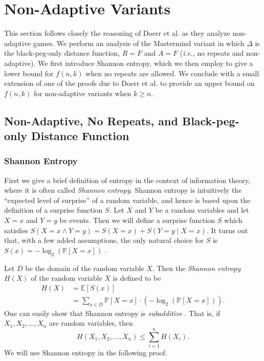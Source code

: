\documentclass[12pt, a4paper]{article}
\begin{document}
\section{Non-Adaptive Variants}
This section follows closely the reasoning of Doerr et al. \cite{DS13} as they analyze non-adaptive games.  We perform an analysis of the Mastermind variant in which $\Delta$ is the black-peg-only distance function, $R=F$ and $A=F$ (\textit{i.e.,} no repeats and non-adaptive). We first introduce Shannon entropy, which we then employ to give a lower bound for $f(n,k)$ when no repeats are allowed. We conclude with a small extension of one of the proofs due to Doerr et al. to provide an upper bound on $f(n,k)$ for non-adaptive variants when $k\ge n$.
\subsection{Non-Adaptive, No Repeats, and Black-peg-only Distance Function}

\subsubsection{Shannon Entropy}\label{sssec:shannonEntropy}
First we give a brief definition of entropy in the context of information theory, where it is often called \textit{Shannon entropy}. Shannon entropy is intuitively the ``expected level of surprise'' of a random variable, and hence is based upon the definition of a surprise function $S$. Let $X$ and $Y$ be a random variables and let $X=x$ and $Y=y$ be events. Then we will define a surprise function $S$ which satisfies $S(X=x\land Y=y) = S(X=x) + S(Y=y\mid X=x)$. It turns out that, with a few added assumptions, the only natural choice for $S$ is $S(x) = -\log_2(\mathbb{P}[X = x])$ \cite{DG14}.

Let $D$ be the domain of the random variable $X$. Then the \textit{Shannon entropy} $H(X)$ of the random variable $X$ is defined to be
\begin{align*}
	H(X)
	& = \mathbb{E}[S(x)]\\
	& = \sum_{x\in D}\mathbb{P}[X=x]\cdot (-\log_2(\mathbb{P}[X=x])).
\end{align*}
One can easily show that Shannon entropy is \textit{subadditive} \cite{DG14}. That is, if $X_1, X_2, \ldots, X_n$ are random variables, then
	\begin{equation}\label{subadditivityDefinition}
			H(X_1, X_2, \ldots, X_n)\le \sum_{i=1}^{n}H(X_i).
	\end{equation}
We will use Shannon entropy in the following proof.
\end{document}
